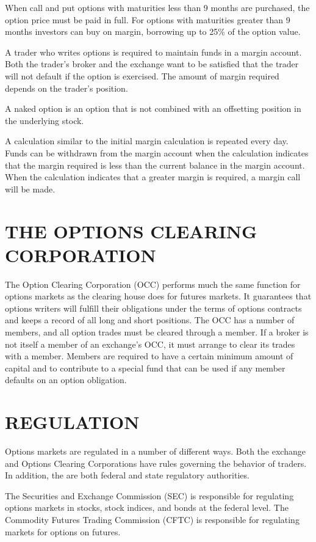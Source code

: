 \documentclass{article}
\begin{document}
When call and put options with maturities less than 9 months are purchased, the option price must be paid in full. For options with maturities greater than 9 months investors can buy on margin, borrowing up to 25\% of the option value.

A trader who writes options is required to maintain funds in a margin account. Both the trader's broker and the exchange want to be satisfied that the trader will not default if the option is exercised. The amount of margin required depends on the trader's position.

A naked option is an option that is not combined with an offsetting position in the underlying stock.

A calculation similar to the initial margin calculation is repeated every day. Funds can be withdrawn from the margin account when the calculation indicates that the margin required is less than the current balance in the margin account. When the calculation indicates that a greater margin is required, a margin call will be made.

\section{THE OPTIONS CLEARING CORPORATION}
The Option Clearing Corporation (OCC) performs much the same function for options markets as the clearing house does for futures markets. It guarantees that options writers will fulfill their obligations under the terms of options contracts and keeps a record of all long and short positions. The OCC has a number of members, and all option trades must be cleared through a member. If a broker is not itself a member of an exchange's OCC, it must arrange to clear its trades with a member. Members are required to have a certain minimum amount of capital and to contribute to a special fund that can be used if any member defaults on an option obligation.

\section{REGULATION}
Options markets are regulated in a number of different ways. Both the exchange and Options Clearing Corporations have rules governing the behavior of traders. In addition, the are both federal and state regulatory authorities.

The Securities and Exchange Commission (SEC) is responsible for regulating options markets in stocks, stock indices, and bonds at the federal level. The Commodity Futures Trading Commission (CFTC) is responsible for regulating markets for options on futures.
\end{document}
